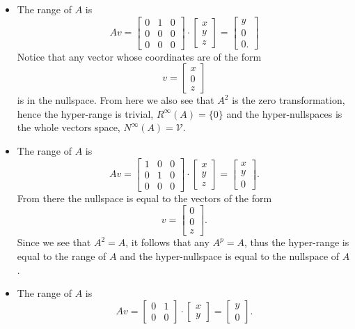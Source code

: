 \documentclass{article}
\begin{document}
\begin{solution}
  \begin{itemize}
    \item The range of $A$ is 
      \[A v = \begin{bmatrix} 0 & 1 & 0\\ 0 & 0 & 0\\ 0 & 0 & 0 \end{bmatrix} \cdot \begin{bmatrix} x\\ y\\ z \end{bmatrix} = \begin{bmatrix} y\\ 0\\ 0. \end{bmatrix}\]
      Notice that any vector whose coordinates are of the form 
      \[v = \begin{bmatrix} x\\ 0\\ z \end{bmatrix}\]
      is in the nullspace.
      From here we also see that $A^2$ is the zero transformation, hence the hyper-range is trivial, $R^{\infty}(A) = \{0\}$ and the hyper-nullspaces is the whole vectors space, $N^{\infty}(A) = \mathcal{V}$.
    \item The range of $A$ is 
      \[A v = \begin{bmatrix} 1 & 0 & 0\\ 0 & 1 & 0\\ 0 & 0 & 0 \end{bmatrix} \cdot \begin{bmatrix} x\\ y\\ z \end{bmatrix} = \begin{bmatrix} x\\ y\\ 0 \end{bmatrix}.\]
      From there the nullspace is equal to the vectors of the form 
      \[v = \begin{bmatrix} 0\\ 0\\ z \end{bmatrix}.\]
      Since we see that $A^2 = A$, it follows that any $A^p = A$, thus the hyper-range is equal to the range of $A$ and the hyper-nullspace is equal to the nullspace of $A$.
    \item The range of $A$ is 
      \[A v = \begin{bmatrix} 0 & 1\\ 0 & 0 \end{bmatrix} \cdot \begin{bmatrix} x\\ y \end{bmatrix} = \begin{bmatrix} y\\ 0 \end{bmatrix}.\]

\end{itemize}
\end{solution}
\end{document}
